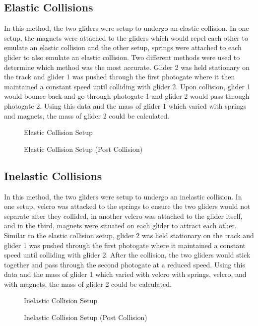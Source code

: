 \documentclass[12pt]{article}
\begin{document}
\subsection{Elastic Collisions}
In this method, the two gliders were setup to undergo an elastic collision. In one setup, the magnets were attached to the gliders which would repel each other to emulate an elastic collision and the other setup, springs were attached to each glider to also emulate an elastic collision. Two different methods were used to determine which method was the most accurate. Glider 2 was held stationary on the track and glider 1 was pushed through the first photogate where it then maintained a constant speed until colliding with glider 2. Upon collision, glider 1 would bounce back and go through photogate 1 and glider 2 would pass through photogate 2. Using this data and the mass of glider 1 which varied with springs and magnets, the mass of glider 2 could be calculated.
\begin{subfigures}
	\begin{figure}[H]
		\centering
		
		\caption{Elastic Collision Setup}
	\end{figure}
	\begin{figure}[H]
		\centering
		
		\caption{Elastic Collision Setup (Post Collision)}
	\end{figure}
\end{subfigures}
\subsection{Inelastic Collisions}
In this method, the two gliders were setup to undergo an inelastic collision. In one setup, velcro was attacked to the springs to ensure the two gliders would not separate after they collided, in another velcro was attached to the glider itself, and in the third, magnets were situated on each glider to attract each other. Similar to the elastic collision setup, glider 2 was held stationary on the track and glider 1 was pushed through the first photogate where it maintained a constant speed until colliding with glider 2. After the collision, the two gliders would stick together and pass through the second photogate at a reduced speed. Using this data and the mass of glider 1 which varied with velcro with springs, velcro, and with magnets, the mass of glider 2 could be calculated.
\begin{subfigures}
	\begin{figure}[H]
		\centering
		\caption{Inelastic Collision Setup}
	\end{figure}
	\begin{figure}[H]
		\centering
		    
		\caption{Inelastic Collision Setup (Post Collision)}
	\end{figure}
\end{subfigures}
\end{document}
